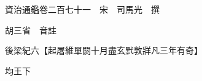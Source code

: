 










 


 
 


 

  
  
  
  
  





  
  
  
  
  
 
  

  

  
  
  



  

 
 

  
   




  

  
  


  　　資治通鑑卷二百七十一　宋　司馬光　撰

　　胡三省　音註

　　後梁紀六【起屠維單閼十月盡玄黓敦牂凡三年有奇】

　　均王下

